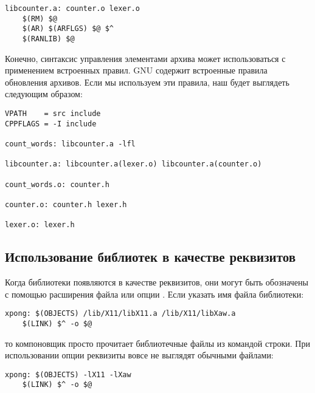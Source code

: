 {\footnotesize
\begin{verbatim}
libcounter.a: counter.o lexer.o
    $(RM) $@
    $(AR) $(ARFLGS) $@ $^
    $(RANLIB) $@
\end{verbatim}
}

Конечно, синтаксис управления элементами архива может использоваться с
применением встроенных правил. GNU \GNUmake{} содержит встроенные
правила обновления архивов. Если мы используем эти правила, наш
\Makefile{} будет выглядеть следующим образом:

{\footnotesize
\begin{verbatim}
VPATH    = src include
CPPFLAGS = -I include

count_words: libcounter.a -lfl

libcounter.a: libcounter.a(lexer.o) libcounter.a(counter.o)

count_words.o: counter.h

counter.o: counter.h lexer.h

lexer.o: lexer.h
\end{verbatim}
}

\subsection{Использование библиотек в качестве реквизитов}

Когда библиотеки появляются в качестве реквизитов, они могут быть
обозначены с помощью расширения файла или опции . Если
указать имя файла библиотеки:

{\footnotesize
\begin{verbatim}
xpong: $(OBJECTS) /lib/X11/libX11.a /lib/X11/libXaw.a
    $(LINK) $^ -o $@
\end{verbatim}
}

{\noindent то компоновщик просто прочитает библиотечные файлы из
командой строки.  При использовании опции  реквизиты вовсе
не выглядят обычными файлами:}

{\footnotesize
\begin{verbatim}
xpong: $(OBJECTS) -lX11 -lXaw
    $(LINK) $^ -o $@
\end{verbatim}
}

